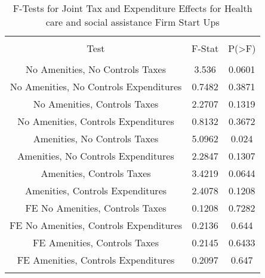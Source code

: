 
\begin{table}[!htbp] \centering 
  \caption{F-Tests for Joint Tax and Expenditure Effects for Health care and social assistance Firm Start Ups} 
  \label{62Ftests} 
\begin{tabular}{@{\extracolsep{5pt}} ccc} 
\\[-1.8ex]\hline 
\hline \\[-1.8ex] 
Test & F-Stat & P(\textgreater F) \\ 
\hline \\[-1.8ex] 
No Amenities, No Controls Taxes & 3.536 & 0.0601 \\ 
No Amenities, No Controls Expenditures & 0.7482 & 0.3871 \\ 
No Amenities, Controls Taxes & 2.2707 & 0.1319 \\ 
No Amenities, Controls Expenditures & 0.8132 & 0.3672 \\ 
Amenities, No Controls Taxes & 5.0962 & 0.024 \\ 
Amenities, No Controls Expenditures & 2.2847 & 0.1307 \\ 
Amenities, Controls Taxes & 3.4219 & 0.0644 \\ 
Amenities, Controls Expenditures & 2.4078 & 0.1208 \\ 
FE No Amenities, Controls Taxes & 0.1208 & 0.7282 \\ 
FE No Amenities, Controls Expenditures & 0.2136 & 0.644 \\ 
FE Amenities, Controls Taxes & 0.2145 & 0.6433 \\ 
FE Amenities, Controls Expenditures & 0.2097 & 0.647 \\ 
\hline \\[-1.8ex] 
\end{tabular} 
\end{table} 
